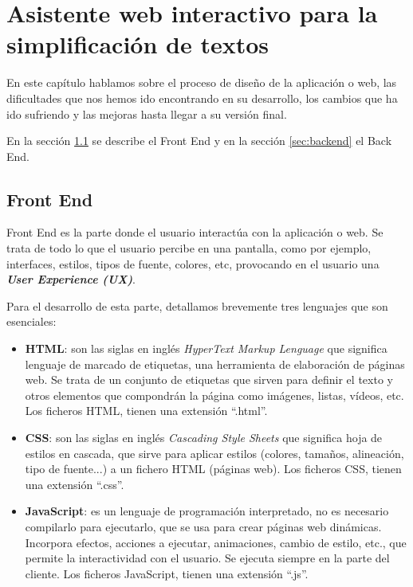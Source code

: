 \chapter{Asistente web interactivo para la simplificación de textos}
\label{cap:asistente}


En este capítulo hablamos sobre el proceso de diseño de la aplicación o web, las dificultades que nos hemos ido encontrando en su desarrollo, los cambios que ha ido sufriendo y las mejoras hasta llegar a su versión final.

En la sección  \ref{sec:frontend} se describe el Front End y en la sección \ref{sec:backend} el Back End.

\section{Front End}\label{sec:frontend}

Front End es la parte donde el usuario interactúa con la aplicación o web. Se trata de todo lo que el usuario percibe en una pantalla, como por ejemplo, interfaces, estilos, tipos de fuente, colores, etc, provocando en el usuario una \textit{\textbf{User Experience (UX)}}.
 
 
Para el desarrollo de esta parte, detallamos brevemente tres lenguajes que son esenciales: 

 
\begin{itemize}
	\item \textbf{HTML}: son las siglas en inglés \textit{HyperText Markup Lenguage} que significa lenguaje de marcado de etiquetas, una herramienta de elaboración de páginas web. Se trata de un conjunto de etiquetas que sirven para definir el texto y otros elementos que compondrán la página como imágenes, listas, vídeos, etc. Los ficheros HTML, tienen una extensión ``.html''. 
	
	\item \textbf{CSS}: son las siglas en inglés \textit{Cascading Style Sheets} que significa hoja de estilos en cascada, que sirve para aplicar estilos (colores, tamaños, alineación, tipo de fuente...) a un fichero HTML (páginas web). Los ficheros CSS, tienen una extensión ``.css''.
	
		\item \textbf{JavaScript}: es un lenguaje de programación interpretado, no es necesario compilarlo para ejecutarlo, que se usa para crear páginas web dinámicas. Incorpora efectos, acciones a ejecutar, animaciones, cambio de estilo, etc., que permite la interactividad con el usuario. Se ejecuta siempre en la parte del cliente. Los ficheros JavaScript, tienen una extensión ``.js''.
	
\end{itemize}
